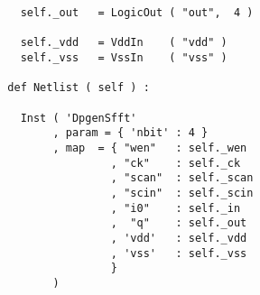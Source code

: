 \begin{itemize}
\begin{verbatim}
    self._out   = LogicOut ( "out",  4 )

    self._vdd   = VddIn    ( "vdd" )
    self._vss   = VssIn    ( "vss" )
    
  def Netlist ( self ) :
      
    Inst ( 'DpgenSfft'
         , param = { 'nbit' : 4 }
         , map  = { "wen"   : self._wen
                  , "ck"    : self._ck
                  , "scan"  : self._scan
                  , "scin"  : self._scin
                  , "i0"    : self._in
                  ,  "q"    : self._out
                  , 'vdd'   : self._vdd
                  , 'vss'   : self._vss
                  }
         )
\end{verbatim}
\end{itemize}
